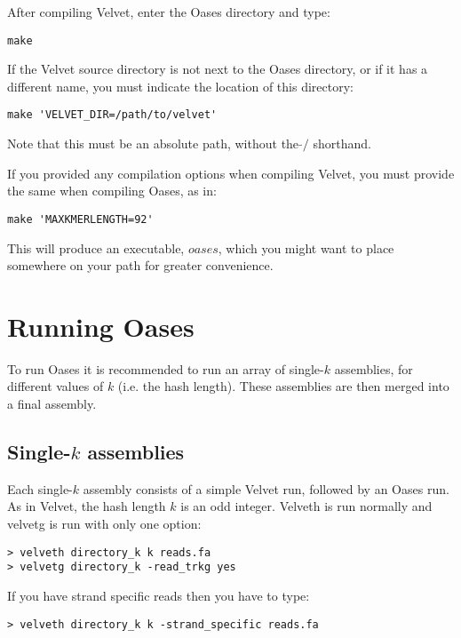 \documentclass[12pt]{article}
\begin{document}
After compiling Velvet, enter the Oases directory and type:

\begin{verbatim}
make
\end{verbatim}

If the Velvet source directory is not next to the Oases directory, or if it has a different name, you must indicate the location of this directory:

\begin{verbatim}
make 'VELVET_DIR=/path/to/velvet'
\end{verbatim}

Note that this must be an absolute path, without the $\tilde{}/$ shorthand.

If you provided any compilation options when compiling Velvet, you must provide the same when compiling Oases, as in:

\begin{verbatim}
make 'MAXKMERLENGTH=92'
\end{verbatim}

This will produce an executable, $oases$, which you might want to place somewhere on your path for greater convenience.

\section{Running Oases}

To run Oases it is recommended to run an array of single-$k$ assemblies, for different values of $k$ (i.e. the hash length). These assemblies are then merged into a final assembly. 

\subsection{Single-$k$ assemblies}

Each single-$k$ assembly consists of a simple Velvet run, followed by an Oases run. As in Velvet, the hash length $k$ is an odd integer. Velveth is run normally and velvetg is run with only one option:

\begin{verbatim}
> velveth directory_k k reads.fa
> velvetg directory_k -read_trkg yes
\end{verbatim}

If you have strand specific reads then you have to type:
\begin{verbatim}
> velveth directory_k k -strand_specific reads.fa
\end{verbatim}
\end{document}
